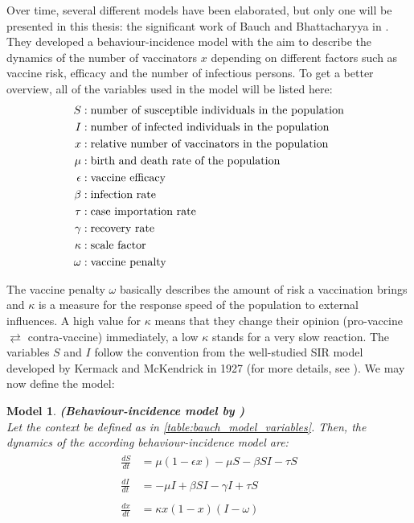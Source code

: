 \documentclass[12pt,a4paper,twoside]{article}
\newtheorem{model}{Model}[section]
\begin{document}
Over time, several different models have been elaborated, but only one will be presented in this thesis: the significant work of Bauch and Bhattacharyya in \cite{Bauch2012}. They developed a behaviour-incidence model with the aim to describe the dynamics of the number of vaccinators $x$ depending on different factors such as vaccine risk, efficacy and the number of infectious persons. To get a better overview, all of the variables used in the model will be listed here:
\begin{align}\label{table:bauch_model_variables}
\begin{split}
S &: \textnormal{number of susceptible individuals in the population}\\
I &: \textnormal{number of infected individuals in the population}\\
x &: \textnormal{relative number of vaccinators in the population}\\
\mu &: \textnormal{birth and death rate of the population}\\
\epsilon &: \textnormal{vaccine efficacy}\\
\beta &: \textnormal{infection rate}\\
\tau &: \textnormal{case importation rate}\\
\gamma &: \textnormal{recovery rate}\\
\kappa &: \textnormal{scale factor}\\
\omega &: \textnormal{vaccine penalty}
\end{split}
\end{align}

The vaccine penalty $\omega$ basically describes the amount of risk a vaccination brings and $\kappa$ is a measure for the response speed of the population to external influences. A high value for $\kappa$ means that they change their opinion (pro-vaccine $\rightleftarrows$ contra-vaccine) immediately, a low $\kappa$ stands for a very slow reaction. The variables $S$ and $I$ follow the convention from the well-studied \ac{SIR} model developed by Kermack and McKendrick in 1927 (for more details, see \cite{Muller2015}). We may now define the model:
\begin{model}\textbf{(Behaviour-incidence model by \cite{Bauch2012})}\label{model:bauch}\\
	Let the context be defined as in \eqref{table:bauch_model_variables}. Then, the dynamics of the according behaviour-incidence model are:
	\begin{align}
	\begin{split}
	\frac{dS}{dt} &= \mu\left(1-\epsilon x\right) - \mu S - \beta SI - \tau S\\
	&\\
	\frac{dI}{dt} &= -\mu I + \beta SI - \gamma I + \tau S\\
	&\\
	\frac{dx}{dt} &= \kappa x\left(1 - x\right)\left(I - \omega\right)
	\end{split}
	\end{align}
\end{model}
\end{document}
